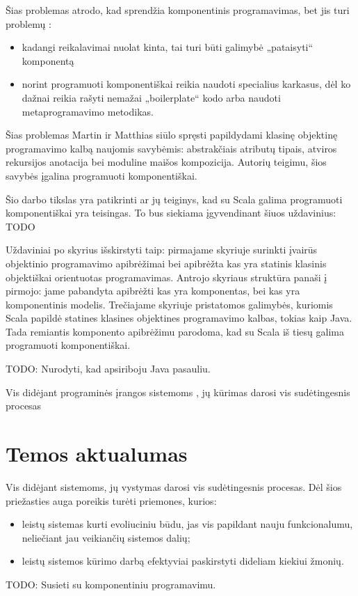 Šias problemas atrodo, kad sprendžia komponentinis programavimas,
bet jis turi problemų :
\begin{itemize}
  \item kadangi reikalavimai nuolat kinta, tai turi būti galimybė
    „pataisyti“ komponentą\cite[vii]{extensible-software-components}
  \item norint programuoti komponentiškai reikia naudoti specialius
    karkasus, dėl ko dažnai reikia rašyti nemažai „boilerplate“ kodo
    arba naudoti metaprogramavimo metodikas.
\end{itemize}

Šias problemas Martin ir Matthias siūlo spręsti papildydami klasinę
objektinę programavimo kalbą naujomis savybėmis: abstrakčiais
atributų tipais, atviros rekursijos anotacija bei moduline maišos
kompozicija. Autorių teigimu, šios savybės įgalina programuoti
komponentiškai.

Šio darbo tikslas yra patikrinti ar jų teiginys, kad su Scala
galima programuoti komponentiškai yra teisingas. To bus siekiama
įgyvendinant šiuos uždavinius: TODO

Uždaviniai po skyrius išskirstyti taip: pirmajame skyriuje surinkti
įvairūs objektinio programavimo apibrėžimai bei apibrėžta kas
yra statinis klasinis objektiškai orientuotas programavimas.
Antrojo skyriaus struktūra panaši į pirmojo: jame pabandyta
apibrėžti kas yra komponentas, bei kas yra komponentinis modelis.
Trečiajame skyriuje pristatomos galimybės, kuriomis Scala
papildė statines klasines objektines programavimo kalbas, tokias
kaip Java. Tada remiantis komponento apibrėžimu parodoma, kad
su Scala iš tiesų galima programuoti komponentiškai.

TODO: Nurodyti, kad apsiriboju Java pasauliu.

Vis didėjant programinės įrangos sistemoms , jų kūrimas darosi vis sudėtingesnis procesas

\section{Temos aktualumas}

Vis didėjant sistemoms, jų vystymas darosi vis sudėtingesnis procesas.
Dėl šios priežasties auga poreikis turėti priemones, kurios:
\begin{itemize}
  \item leistų sistemas kurti evoliuciniu būdu, jas vis papildant nauju
    funkcionalumu, neliečiant jau veikiančių sistemos dalių;
  \item leistų sistemos kūrimo darbą efektyviai paskirstyti dideliam
    kiekiui žmonių.
\end{itemize}
TODO: Susieti su komponentiniu programavimu.

